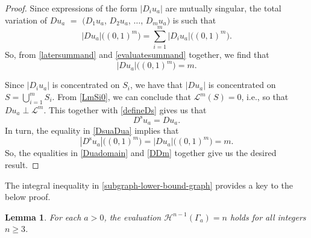 \documentclass{publicadapt}
\newtheorem{lemma}{Lemma}%
\begin{document}
\begin{proof}
 Since expressions of the form $\left| D_{i} u_{a} \right|$ are mutually singular, the total variation of $ Du_a$ $ =$ $ \big( D_1u_a$, $D_2 u_a$, $ \ldots$, $ D_m u_a \big) $ 
 is such that 
\begin{equation}\label{evaluatesummand} 
 \left| Du_a \right|\big( (0, 1)^{m} \big) = \sum_{i=1}^{m} \left| D_i u_a \right|\big( (0, 1)^{m} \big). 
\end{equation}
 So, from \eqref{latersummand} and \eqref{evaluatesummand} together, we find that 
\begin{equation}\label{Duadomain} 
 \left| D u_a \right|\big( (0, 1)^{m} \big) = m. 
\end{equation}

 Since $\left| D_{i} u_{a} \right|$ is concentrated on $S_{i}$, we have that $\left| Du_a \right|$ is concentrated on $S = \bigcup_{i=1}^{m} S_{i}$. From \eqref{LmSi0}, we can 
 conclude that $\mathcal{L}^{m}(S) = 0$, i.e., so that $Du_a \perp \mathcal{L}^{m}$. This together with \eqref{defineDs} gives us that 
\begin{equation}\label{DsuaDua}
 D^{\operatorname{s}}u_a = Du_a. 
\end{equation}
 In turn, the equality in \eqref{DsuaDua} implies that 
\begin{equation}\label{DDm}
 \left| D^{\operatorname{s}} u_a \right|\big( (0, 1)^{m} \big) = \left| Du_a \right|\big( (0, 1)^{m} \big) = m. 
\end{equation}
 So, the equalities in \eqref{Duadomain} and \eqref{DDm} together give us the desired result. 
\end{proof}

 The integral inequality in \eqref{subgraph-lower-bound-graph} provides a key to the below proof. 

\begin{lemma}\label{beforetheorem}%
 For each $a > 0$, the evaluation $ \mathcal H^{n-1}(\Gamma_a)=n $ holds for all integers \(n\geq 3\).
\end{lemma}
\end{document}
